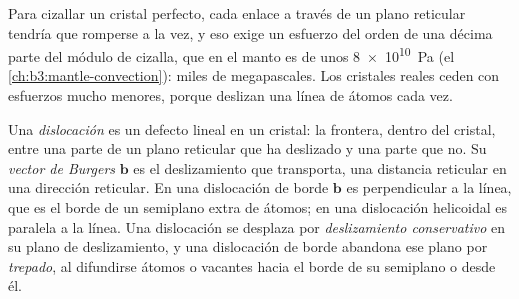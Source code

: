 Para cizallar un cristal perfecto, cada enlace a través de un plano reticular tendría que
romperse a la vez, y eso exige un esfuerzo del orden de una décima parte del módulo de
cizalla, que en el manto es de unos \qty{8e10}{Pa}
(el \cref{ch:b3:mantle-convection}): miles de megapascales. Los cristales reales
ceden con esfuerzos mucho menores, porque deslizan una línea de átomos cada vez.

\begin{definition}[Dislocación]\label{def:b3:deformation-mechanisms:dislocation}
Una \emph{dislocación} es un defecto lineal en un
cristal: la frontera, dentro del cristal, entre una parte de un plano reticular
que ha deslizado y una parte que no. Su \emph{vector de Burgers}
$\mathbf b$ es el deslizamiento que transporta, una distancia reticular en una
dirección reticular. En una dislocación de borde $\mathbf b$ es perpendicular a la línea,
que es el borde de un semiplano extra de átomos; en una dislocación helicoidal es
paralela a la línea. Una dislocación se desplaza por \emph{deslizamiento conservativo} en su plano de deslizamiento,
y una dislocación de borde abandona ese plano por \emph{trepado}, al difundirse átomos o
vacantes hacia el borde de su semiplano o desde él.
\end{definition}


